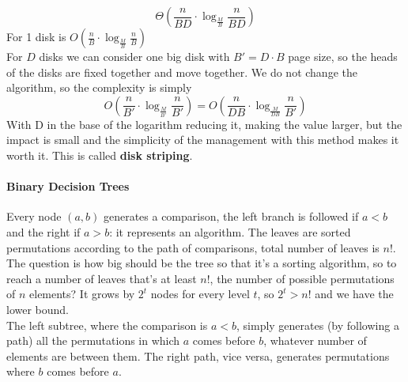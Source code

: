 \documentclass[10pt]{report}
\begin{document}
$$\Theta\left(\frac{n}{BD}\cdot\log_{\frac{M}{B}}\frac{n}{BD}\right)$$
For 1 disk is $O(\frac{n}{B}\cdot\log_{\frac{M}{B}}\frac{n}{B})$\\
For $D$ disks we can consider one big disk with $B' = D\cdot B$ page size, so the heads of the disks are fixed together and move together. We do not change the algorithm, so the complexity is simply $$O\left(\frac{n}{B'}\cdot\log_{\frac{M}{B'}}\frac{n}{B'}\right) = O\left(\frac{n}{DB}\cdot\log_{\frac{M}{DB}}\frac{n}{B'}\right)$$ With D in the base of the logarithm reducing it, making the value larger, but the impact is small and the simplicity of the management with this method makes it worth it. This is called \textbf{disk striping}.
\paragraph{Binary Decision Trees} Every node $(a,b)$ generates a comparison, the left branch is followed if $a<b$ and the right if $a>b$: it represents an algorithm. The leaves are sorted permutations according to the path of comparisons, total number of leaves is $n!$. The question is how big should be the tree so that it's a sorting algorithm, so to reach a number of leaves that's at least $n!$, the number of possible permutations of $n$ elements? It grows by $2^t$ nodes for every level $t$, so $2^t > n!$ and we have the lower bound.\\
The left subtree, where the comparison is $a < b$, simply generates (by following a path) all the permutations in which $a$ comes before $b$, whatever number of elements are between them. The right path, vice versa, generates permutations where $b$ comes before $a$.
\end{document}
